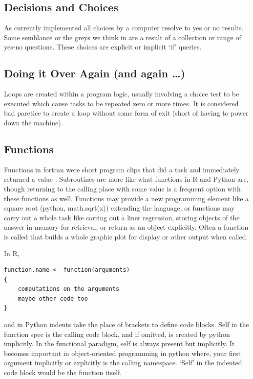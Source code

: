 \documentclass[]{book}
\theoremstyle{definition}
\theoremstyle{definition}
\theoremstyle{definition}
\theoremstyle{remark}
\begin{document}
\subsection{Decisions and Choices}\label{decisions-and-choices}

As currently implemented all choices by a computer resolve to yes or no
results. Some semblance or the greys we think in are a result of a
collection or range of yes-no questions. These choices are explicit or
implicit `if' queries.

\subsection{Doing it Over Again (and again
\ldots{})}\label{doing-it-over-again-and-again}

Loops are created within a program logic, usually involving a choice
test to be executed which cause tasks to be repeated zero or more times.
It is considered bad parctice to create a loop without some form of exit
(short of having to power down the machine).

\subsection{Functions}\label{functions}

Functions in fortran were short program clips that did a task and
immediately returned a value . Subroutines are more like what functions
in R and Python are, though returning to the calling place with some
value is a frequent option with these functions as well. Functions may
provide a new programming element like a square root (python,
math.sqrt(x)) extending the language, or functions may carry out a whole
task like carring out a liner regression, storing objects of the answer
in memory for retrieval, or return as an object explicitly. Often a
function is called that builds a whole graphic plot for display or other
output when called.

In R,

\begin{verbatim}
function.name <- function(arguments) 
{
    computations on the arguments
    maybe other code too
}
\end{verbatim}

and in Python indents take the place of brackets to define code blocks.
Self in the function spec is the calling code block, and if omitted, is
created by python implicitly. In the functional paradigm, self is always
present but implicitly. It becomes important in object-oriented
programming in python where, your first argument implicitly or
explicitly is the calling namespace. `Self' in the indented code block
would be the function itself.
\end{document}
